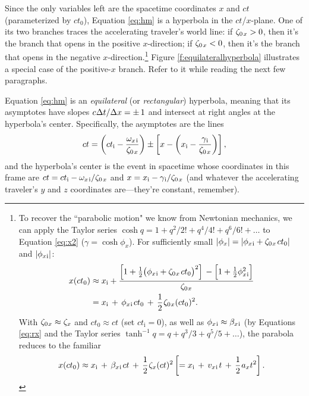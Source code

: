 \documentclass[12pt]{article}
\begin{document}
Since the only variables left are the spacetime coordinates $x$ and $ct$ (parameterized by $ct_0$), Equation \ref{eq:hm} is a hyperbola in the $ct$/$x$-plane. One of its two branches traces the accelerating traveler's world line: if $\zeta_{0 \mkern2mu x} > 0$, then it's the branch that opens in the positive $x$-direction; if $\zeta_{0 \mkern2mu x} < 0$, then it's the branch that opens in the negative $x$-direction.\footnote{To recover the ``parabolic motion" we know from Newtonian mechanics, we can apply the Taylor series $\cosh{q} = 1 + q^2/2! + q^4/4! + q^6/6! + \dots$ to Equation \ref{eq:x2} ($\gamma = \cosh{\phi_x}$). For sufficiently small $| \phi_x | = | \phi_{x \mkern1mu \textrm{i} } + \zeta_{0 \mkern1mu x} \mkern2mu ct_0 |$ and $| \phi_{x \mkern1mu \textrm{i} } |$:
\begin{equation*}
\begin{split}
x(ct_0) &\approx x_{\mathrm{i}} + \dfrac{ \left[ 1 + \frac{1}{2} \big( \phi_{x \mkern1mu \textrm{i} } + \zeta_{0 \mkern1mu x} \mkern2mu ct_0 \big)^2 \right] \vphantom{\big|_{\mathstrut_{\mathstrut_{A}}}}  - \Bigl[ 1 + \frac{1}{2} \phi^2_{x \mkern1mu \textrm{i} } \Bigr] }{ \zeta_{0 \mkern1mu x}}\\
&=  x_{\mathrm{i}} \,  + \, \phi_{x \mkern1mu \textrm{i} } \mkern2mu ct_0 \, + \, \dfrac{1}{2} \mkern1mu \zeta_{0 \mkern1mu x} (ct_0)^2 .
\end{split}
\end{equation*}
With $\zeta_{0 \mkern1mu x} \approx \zeta_{x}$ and $ct_0 \approx ct$ (set $ct_{\mathrm{i}} = 0$), as well as $\phi_{x \mkern1mu \textrm{i} } \approx \beta_{x \mkern1mu \mathrm{i} }$ (by Equations \ref{eq:rx} and the Taylor series $\tanh^{-1}{q} = q + q^3/3 + q^5/5 + \dots$), the parabola reduces to the familiar
\begin{equation*}
x(ct_0) \approx x_{\mathrm{i}} \, + \, \beta_{x \mkern1mu \mathrm{i} } \mkern2mu ct \, + \, \dfrac{1}{2} \mkern1mu \zeta_{x} (ct)^2 \left[ = x_{\mathrm{i}} \, + \, v_{x \mkern1mu \mathrm{i} } \mkern2mu t \, + \, \dfrac{1}{2} \mkern1mu a_{x} t^2 \right] .
\end{equation*}
} Figure \ref{f:equilateralhyperbola} illustrates a special case of the positive-$x$ branch. Refer to it while reading the next few paragraphs.

Equation \ref{eq:hm} is an \emph{equilateral} (or \emph{rectangular}) hyperbola, meaning that its asymptotes have slopes $c \mkern.5mu \Delta t / \Delta x = \pm \, 1$ and intersect at right angles at the hyperbola's center. Specifically, the asymptotes are the lines
\begin{equation*}
ct = \left( ct_{\mathrm{i}} - \dfrac{\omega_{x \mkern2mu \textrm{i} }}{ \zeta_{0 \mkern2mu x}} \right) \pm \left[  x - \left( x_{\mathrm{i}} - \dfrac{\gamma_{\mkern1mu \mathrm{i}}}{ \zeta_{0 \mkern2mu x}} \right) \right],
\end{equation*}
and the hyperbola's center is the event in spacetime whose coordinates in this frame are $ct = ct_{\mathrm{i}} - \omega_{x \mkern2mu \textrm{i} } / \zeta_{0 \mkern2mu x}$ and $x = x_{\mathrm{i}} - \gamma_{\mkern1mu \mathrm{i}} / \zeta_{0 \mkern2mu x}$ (and whatever the accelerating traveler's $y$ and $z$ coordinates are---they're constant, remember).
\end{document}
